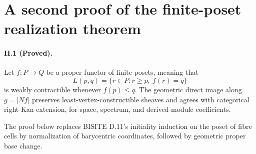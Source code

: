 \section{A second proof of the finite-poset realization theorem}

\paragraph{H.1 (Proved).}
Let $f:P\to Q$ be a proper functor of finite posets, meaning that
\[
 L(p,q)=\{r\in P:r\geq p,\ f(r)=q\}
\]
is weakly contractible whenever $f(p)\leq q$. The geometric direct
image along $g=|Nf|$ preserves least-vertex-constructible sheaves and
agrees with categorical right Kan extension, for space, spectrum,
and derived-module coefficients.

The proof below replaces BISITE D.11's initiality induction on the
poset of fibre cells by normalization of barycentric coordinates,
followed by geometric proper base change.

